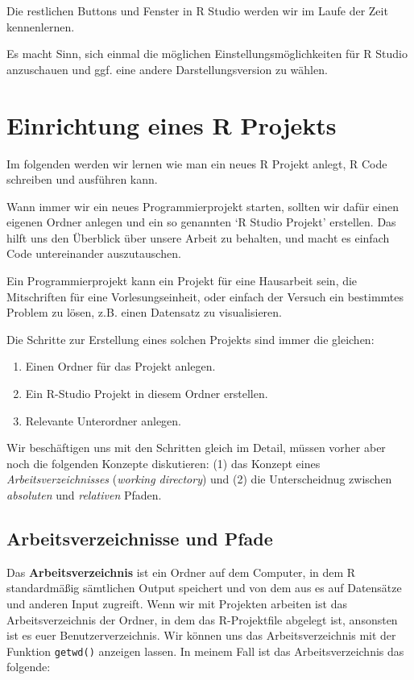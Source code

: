 \documentclass[]{book}
\providecommand{\tightlist}{%
  \setlength{\itemsep}{0pt}\setlength{\parskip}{0pt}}
\begin{document}
Die restlichen Buttons und Fenster in R Studio werden wir im Laufe der
Zeit kennenlernen.

Es macht Sinn, sich einmal die möglichen Einstellungsmöglichkeiten für R
Studio anzuschauen und ggf. eine andere Darstellungsversion zu wählen.

\section{Einrichtung eines R
Projekts}\label{einrichtung-eines-r-projekts}

Im folgenden werden wir lernen wie man ein neues R Projekt anlegt, R
Code schreiben und ausführen kann.

Wann immer wir ein neues Programmierprojekt starten, sollten wir dafür
einen eigenen Ordner anlegen und ein so genannten `R Studio Projekt'
erstellen. Das hilft uns den Überblick über unsere Arbeit zu behalten,
und macht es einfach Code untereinander auszutauschen.

Ein Programmierprojekt kann ein Projekt für eine Hausarbeit sein, die
Mitschriften für eine Vorlesungseinheit, oder einfach der Versuch ein
bestimmtes Problem zu lösen, z.B. einen Datensatz zu visualisieren.

Die Schritte zur Erstellung eines solchen Projekts sind immer die
gleichen:

\begin{enumerate}
\def\labelenumi{\arabic{enumi}.}
\tightlist
\item
  Einen Ordner für das Projekt anlegen.
\item
  Ein R-Studio Projekt in diesem Ordner erstellen.
\item
  Relevante Unterordner anlegen.
\end{enumerate}

Wir beschäftigen uns mit den Schritten gleich im Detail, müssen vorher
aber noch die folgenden Konzepte diskutieren: (1) das Konzept eines
\emph{Arbeitsverzeichnisses} (\emph{working directory}) und (2) die
Unterscheidnug zwischen \emph{absoluten} und \emph{relativen} Pfaden.

\subsection{Arbeitsverzeichnisse und
Pfade}\label{arbeitsverzeichnisse-und-pfade}

Das \textbf{Arbeitsverzeichnis} ist ein Ordner auf dem Computer, in dem
R standardmäßig sämtlichen Output speichert und von dem aus es auf
Datensätze und anderen Input zugreift. Wenn wir mit Projekten arbeiten
ist das Arbeitsverzeichnis der Ordner, in dem das R-Projektfile abgelegt
ist, ansonsten ist es euer Benutzerverzeichnis. Wir können uns das
Arbeitsverzeichnis mit der Funktion \texttt{getwd()} anzeigen lassen. In
meinem Fall ist das Arbeitsverzeichnis das folgende:
\end{document}
